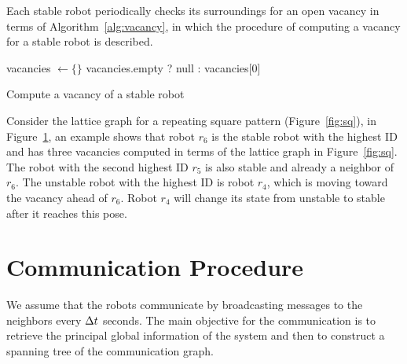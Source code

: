 Each stable robot periodically checks its surroundings for an open vacancy 
in terms of Algorithm~\ref{alg:vacancy}, in which the procedure of computing a vacancy for a stable robot is described. 

\begin{algorithm}
{}
   vacancies $\leftarrow \{\}$\; 
  \Return vacancies.empty ? null : vacancies[0]\;
  \caption{Compute a vacancy of a stable robot}
  \label{alg:vacancy}
\end{algorithm}


Consider the lattice graph for a repeating square pattern  (Figure~\ref{fig:sq}), in Figure~\ref{fig:vacancy}, an example shows that robot $r_6$
is the stable robot with the highest ID and has three vacancies computed in terms of the
lattice graph in Figure~\ref{fig:sq}. 
%
The robot with the second highest ID $r_5$ is also stable and already a neighbor of $r_6$.
%
The unstable robot with the highest ID is robot $r_4$, which is moving toward the vacancy ahead of $r_6$.  
%
Robot $r_4$
will change its state from unstable to stable after it reaches this pose.

\begin{figure}
  \centering
  
  \label{fig:vacancy}
\end{figure}


\section{Communication Procedure}
\label{sec:com}
We assume that the robots communicate by broadcasting messages to the
neighbors every $\Delta t$ seconds.
%
The main objective for the communication is to retrieve the principal global
information of the system and then to construct a spanning tree of the
communication graph.


